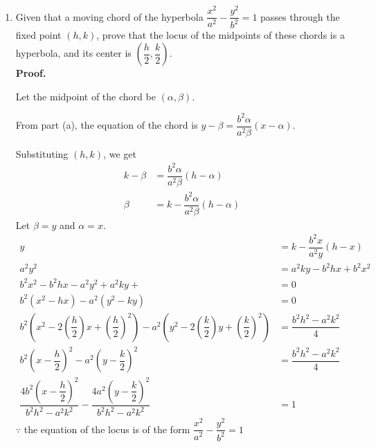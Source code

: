 \documentclass{report}
\newcommand{\proof}{\vspace{1em}\\\textbf{Proof.}}
\begin{document}
\begin{enumerate}[leftmargin=*]
\begin{enumerate}
                    \newpage
              \item  Given that a moving chord of the hyperbola
                    $\dfrac{x^2}{a^2}-\dfrac{y^2}{b^2}=1$ passes through the fixed point $(h, k)$,
                    prove that the locus of the midpoints of these chords is a hyperbola, and its
                    center is $\left(\dfrac{h}{2}, \dfrac{k}{2}\right)$. \proof{}

                    Let the midpoint of the chord be $(\alpha, \beta)$.

                    From part (a), the equation of the chord is $y-\beta=\dfrac{b^2 \alpha}{a^2
                            \beta}(x-\alpha)$.

                    Substituting $(h, k)$, we get
                    \begin{align*}
                        k-\beta & =\dfrac{b^2 \alpha}{a^2 \beta}(h-\alpha)   \\
                        \beta   & =k-\dfrac{b^2 \alpha}{a^2 \beta}(h-\alpha)
                    \end{align*}
                    Let $\beta = y$ and $\alpha = x$.
                    \begin{align*}
                        y                                                                                                                                                                 & =k-\dfrac{b^2 x}{a^2 y}(h-x) \\
                        a^2y^2                                                                                                                                                            & =a^2ky-b^2hx+b^2x^2          \\
                        b^2x^2 - b^2hx - a^2y^2 + a^2ky+                                                                                                                                  & = 0                          \\
                        b^2(x^2 - hx) - a^2(y^2 - ky)                                                                                                                                     & = 0                          \\
                        b^2\left(x^2 - 2\left(\dfrac{h}{2}\right)x + \left(\dfrac{h}{2}\right)^2\right) - a^2\left(y^2 - 2\left(\dfrac{k}{2}\right)y + \left(\dfrac{k}{2}\right)^2\right) & = \dfrac{b^2h^2 - a^2k^2}{4} \\
                        b^2\left(x - \dfrac{h}{2}\right)^2 - a^2\left(y - \dfrac{k}{2}\right)^2                                                                                           & = \dfrac{b^2h^2 - a^2k^2}{4} \\
                        \dfrac{4b^2\left(x - \dfrac{h}{2}\right)^2}{b^2h^2 - a^2k^2} - \dfrac{4a^2\left(y - \dfrac{k}{2}\right)^2}{b^2h^2 - a^2k^2}                                       & = 1
                    \end{align*}
                    $\because$ the equation of the locus is of the form $\dfrac{x^2}{a^2}-\dfrac{y^2}{b^2}=1$


\end{enumerate}
\end{enumerate}
\end{document}

